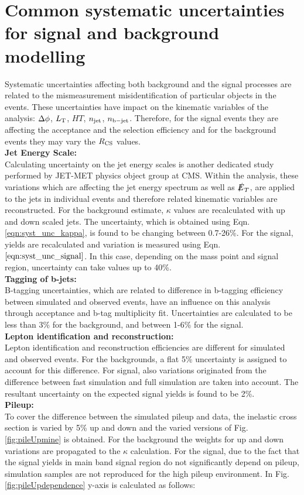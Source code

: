 \section{Common systematic uncertainties for signal and background modelling}
Systematic uncertainties affecting both background and the signal processes are related to the mismeasurement misidentification of particular objects in the events. These uncertainties have impact on the kinematic variables of the analysis: $\Delta \phi$, $L_{\rm T}$, $HT$, $n_{\rm jet}$, $n_{\rm b-jet}$. Therefore, for the signal events they are affecting the acceptance and the selection efficiency and for the background events they may vary the $R_{\rm CS}$ values.\\
\textbf{Jet Energy Scale:}\\
Calculating uncertainty on the jet energy scales is another dedicated study performed by JET-MET physics object group at CMS. Within the analysis, these variations which are affecting the jet energy spectrum as well as $\slashed{E}_T$, are applied to the jets in individual events and therefore related kinematic variables are reconstructed.
For the background estimate, $\kappa$ values are recalculated with up and down scaled jets. The uncertainty, which is obtained using Eqn. \ref{eqn:syst_unc_kappa}, is found to be changing between 0.7-26\%. For the signal, yields are recalculated and variation is measured using Eqn. $\ref{eqn:syst_unc_signal}$. In this case, depending on the mass point and signal region, uncertainty can take values up to 40\%.\\
\textbf{Tagging of b-jets:}\\
B-tagging uncertainties, which are related to difference in b-tagging efficiency between simulated and observed events, have an influence on this analysis through acceptance and b-tag multiplicity fit. Uncertainties are calculated to be less than 3\% for the background, and between 1-6\% for the signal.\\
\textbf{Lepton identification and reconstruction:}\\
Lepton identification and reconstruction efficiencies are different for simulated and observed events. For the backgrounds, a flat 5\% uncertainty is assigned to account for this difference. For signal, also variations originated from the difference between fast simulation \cite{FastSim} and full simulation are taken into account. The resultant uncertainty on the expected signal yields is found to be 2\%. \\
\textbf{Pileup:}\\
To cover the difference between the simulated pileup and data, the inelastic cross section is varied by 5\% up and down and the varied versions of Fig. \ref{fig:pileUpmine} is obtained. For the background the weights for up and down variations are propagated to the $\kappa$ calculation. For the signal, due to the fact that the signal yields in main band signal region do not significantly depend on pileup, simulation samples are not reproduced for the high pileup environment. In Fig. \ref{fig:pileUpdependence} y-axis is calculated as follows:
